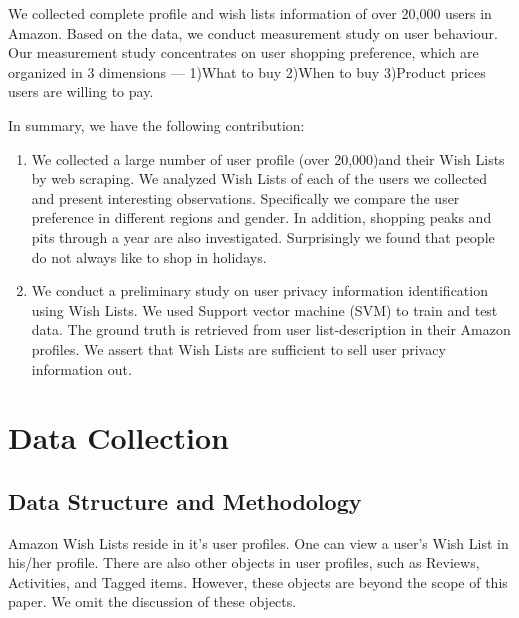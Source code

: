 \documentclass{llncs}
\begin{document}
We collected complete profile and wish lists information of over 20,000 users in Amazon. Based on the data, we conduct measurement study on user behaviour. Our measurement study concentrates on user shopping preference, which are organized in 3 dimensions — 1)What to buy 2)When to buy 3)Product prices users are willing to pay. 

In summary, we have the following contribution:
\begin{enumerate}
\item  We collected a large number of user profile (over 20,000)and their Wish Lists by web scraping. We analyzed Wish Lists of each of the users we collected and present interesting observations. Specifically we compare the user preference in different regions and gender. In addition, shopping peaks and pits through a year are also investigated. Surprisingly we found that people do not always like to shop in holidays.
\item We conduct a preliminary study on user privacy information identification using Wish Lists. We used Support vector machine (SVM) to train and test data. The ground truth is retrieved from user list-description in their Amazon profiles. We assert that Wish Lists are sufficient to sell user privacy information out.
\end{enumerate}

\section{Data Collection}
\subsection{Data Structure and Methodology}
Amazon Wish Lists reside in it's user profiles. One can view a user's Wish List in his/her profile. There are also other objects in user profiles, such as Reviews, Activities, and Tagged items. However, these objects are beyond the scope of this paper. We omit the discussion of these objects. 
\end{document}
